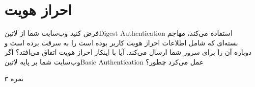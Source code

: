 \documentclass[../main.tex]{subfiles}
\begin{document}
\section{احراز هویت}

فرض کنید وب‌سایت شما از ‌لاتین{Digest Authentication} استفاده می‌کند، مهاجم بسته‌ای که شامل اطلاعات احراز هویت کاربر بوده است را به سرقت برده است و دوباره آن را برای سرور شما ارسال می‌کند. آیا با اینکار احراز هویت اتفاق می‌افتد؟
اگر وب‌سایت شما بر پایه ‌لاتین{Basic Authentication} عمل می‌کرد چطور؟

۳ نمره
\end{document}
